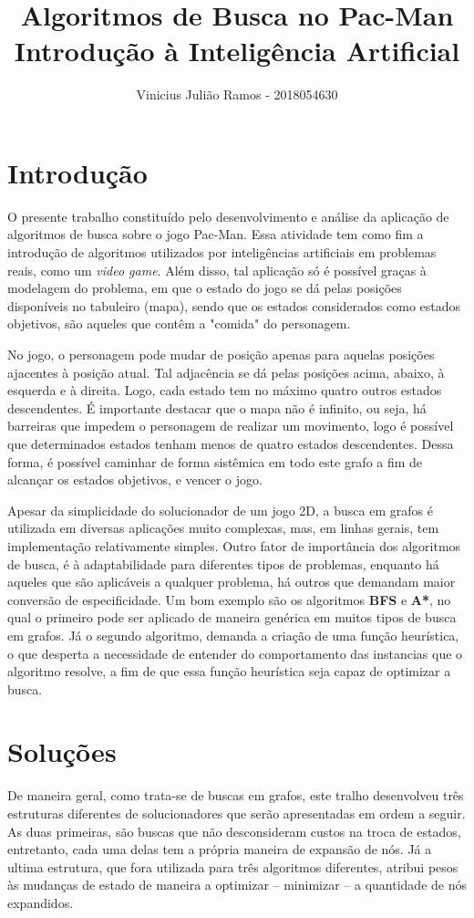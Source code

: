 \documentclass[12pt]{article}
\title{Algoritmos de Busca no Pac-Man \\
Introdução à Inteligência Artificial}
\author{Vinicius Julião Ramos - 2018054630}
\begin{document}
 
\maketitle


\section{Introdução}

O presente trabalho constituído pelo desenvolvimento e análise da aplicação
de algoritmos de busca sobre o jogo Pac-Man.
Essa atividade tem como fim a introdução de algoritmos utilizados por
inteligências artificiais em problemas reais, como um \textit{video game}.
Além disso, tal aplicação só é possível graças à modelagem do problema, em que
o estado do jogo se dá pelas posições disponíveis no tabuleiro (mapa),
sendo que os estados considerados como estados objetivos, são aqueles que
contêm a "comida" do personagem.

No jogo, o personagem pode mudar de posição apenas para aquelas posições
ajacentes à posição atual.
Tal adjacência se dá pelas posições acima, abaixo, à esquerda e à direita.
Logo, cada estado tem no máximo quatro outros estados descendentes.
É importante destacar que o mapa não é infinito, ou seja, há barreiras que
impedem o personagem de realizar um movimento, logo é possível que
determinados estados tenham menos de quatro estados descendentes.
Dessa forma, é possível caminhar de forma sistêmica em todo este grafo a fim
de alcançar os estados objetivos, e vencer o jogo.

Apesar da simplicidade do solucionador de um jogo 2D, a busca em grafos é
utilizada em diversas aplicações muito complexas, mas, em linhas gerais, tem
implementação relativamente simples.
Outro fator de importância dos algoritmos de busca, é à adaptabilidade para
diferentes tipos de problemas, enquanto há aqueles que são aplicáveis a
qualquer problema, há outros que demandam maior conversão de especificidade.
Um bom exemplo são os algoritmos \textbf{BFS} e \textbf{A*}, no qual o primeiro
pode ser aplicado de maneira genérica em muitos tipos de busca em grafos.
Já o segundo algoritmo, demanda a criação de uma função heurística, o que
desperta a necessidade de entender do comportamento das instancias
que o algoritmo resolve, a fim de que essa função heurística seja capaz
de optimizar a busca.

\section{Soluções}
De maneira geral, como trata-se de buscas em grafos, este tralho desenvolveu
três estruturas diferentes de solucionadores que serão apresentadas em
ordem a seguir.
As duas primeiras, são buscas que não desconsideram custos na troca de estados,
entretanto, cada uma delas tem a própria maneira de expansão de nós.
Já a ultima estrutura, que fora utilizada para três algoritmos diferentes,
atribui pesos às mudanças de estado de maneira a optimizar -- minimizar --
a quantidade de nós expandidos.
\end{document}
